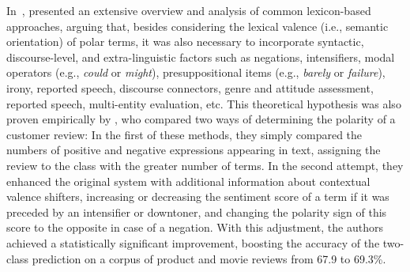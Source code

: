 

In~\citeyear{Polanyi:06}, \citeauthor{Polanyi:06} presented an
extensive overview and analysis of common lexicon-based approaches,
arguing that, besides considering the lexical valence (i.e., semantic
orientation) of polar terms, it was also necessary to incorporate
syntactic, discourse-level, and extra-linguistic factors such as
negations, intensifiers, modal operators (e.g., \emph{could} or
\emph{might}), presuppositional items (e.g., \emph{barely} or
\emph{failure}), irony, reported speech, discourse connectors, genre
and attitude assessment, reported speech, multi-entity evaluation,
etc.  This theoretical hypothesis was also proven empirically by
\citet{Kennedy:06}, who compared two ways of determining the polarity
of a customer review: In the first of these methods, they simply
compared the numbers of positive and negative expressions appearing in
text, assigning the review to the class with the greater number of
terms.  In the second attempt, they enhanced the original system with
additional information about contextual valence shifters, increasing
or decreasing the sentiment score of a term if it was preceded by an
intensifier or downtoner, and changing the polarity sign of this score
to the opposite in case of a negation.  With this adjustment, the
authors achieved a statistically significant improvement, boosting the
accuracy of the two-class prediction on a corpus of product and movie
reviews from 67.9 to 69.3\%.


